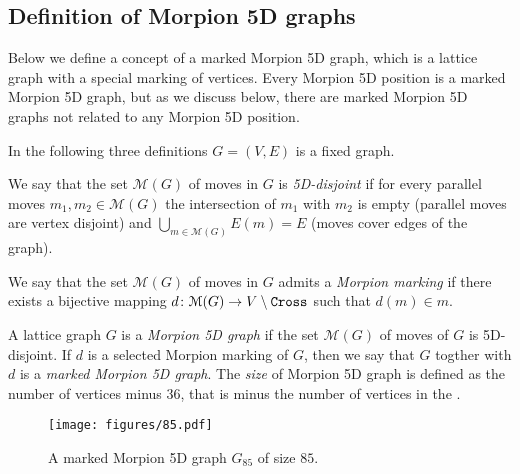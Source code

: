 
\subsection{Definition of Morpion 5D graphs}

Below we define a concept of a marked Morpion 5D graph, which is a lattice graph with a special marking of vertices. Every Morpion 5D position is a marked Morpion 5D graph, but as we discuss below, there are marked Morpion 5D graphs not related to any Morpion 5D position.

In the following 
three definitions  $G = (V, E)$ is a fixed graph. 

\begin{definition} 
We say that the set $\mathcal{M}(G)$ of moves in $G$ is \emph{5D-disjoint}
if for every parallel moves $m_1, m_2 \in \mathcal{M}(G)$ the intersection of $m_1$ with $m_2$ is empty (parallel moves are vertex disjoint) and $\bigcup_{m \in \mathcal{M}(G)} E(m) = E$ (moves cover edges of the graph).
\end{definition}

\begin{definition}
  We say that the set $\mathcal{M}(G)$ of moves in $G$ admits a \emph{Morpion marking} if
     there exists a bijective mapping $d \colon \mathcal{M}(G) \to V \setminus \texttt{Cross}$ such that $d(m) \in m$.
\end{definition}

\begin{definition}
  A lattice graph $G$ is a \emph{Morpion 5D graph} if 
    the set $\mathcal{M}(G)$ of moves of $G$ is 5D-disjoint.
  If $d$ is a selected Morpion marking of $G$, then we say that $G$ togther with $d$ is 
    a \emph{marked Morpion 5D graph}.
  The \emph{size} of Morpion 5D graph  is defined as the number of vertices minus $36$, that is minus the number of vertices in the \Cross.
 \end{definition}


\begin{figure}[h]
    \centering
    \texttt{[image: figures/85.pdf]}
     \caption{
     A marked Morpion 5D graph $G_{85}$ of size $85$.
	}
    \label{fig:85}
\end{figure}

